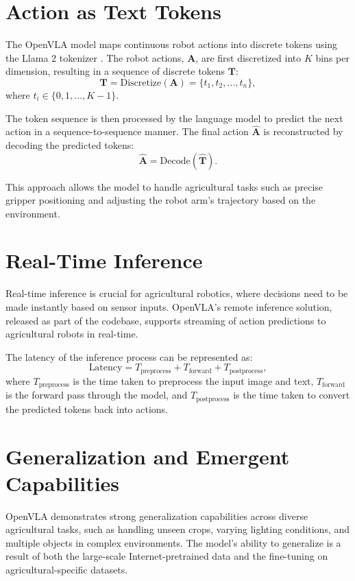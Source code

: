 \section{Action as Text Tokens}
The OpenVLA model maps continuous robot actions into discrete tokens using the Llama 2 tokenizer \cite{touvron2023llamaopenefficientfoundation}. The robot actions, $\mathbf{A}$, are first discretized into $K$ bins per dimension, resulting in a sequence of discrete tokens $\mathbf{T}$:
\[
\mathbf{T} = \text{Discretize}(\mathbf{A}) = \{t_1, t_2, \dots, t_n\},
\]
where $t_i \in \{0, 1, \dots, K-1\}$.

The token sequence is then processed by the language model to predict the next action in a sequence-to-sequence manner\cite{sutskever2014sequencesequencelearningneural}. The final action $\hat{\mathbf{A}}$ is reconstructed by decoding the predicted tokens:
\[
\hat{\mathbf{A}} = \text{Decode}(\hat{\mathbf{T}}).
\]

This approach allows the model to handle agricultural tasks such as precise gripper positioning and adjusting the robot arm's trajectory based on the environment.

\section{Real-Time Inference}
Real-time inference is crucial for agricultural robotics, where decisions need to be made instantly based on sensor inputs. OpenVLA's remote inference solution, released as part of the codebase, supports streaming of action predictions to agricultural robots in real-time.

The latency of the inference process can be represented as:
\[
\text{Latency} = T_{\text{preprocess}} + T_{\text{forward}} + T_{\text{postprocess}},
\]
where $T_{\text{preprocess}}$ is the time taken to preprocess the input image and text, $T_{\text{forward}}$ is the forward pass through the model, and $T_{\text{postprocess}}$ is the time taken to convert the predicted tokens back into actions.


\section{Generalization and Emergent Capabilities}
OpenVLA demonstrates strong generalization capabilities across diverse agricultural tasks, such as handling unseen crops, varying lighting conditions, and multiple objects in complex environments. The model's ability to generalize is a result of both the large-scale Internet-pretrained data and the fine-tuning on agricultural-specific datasets.

